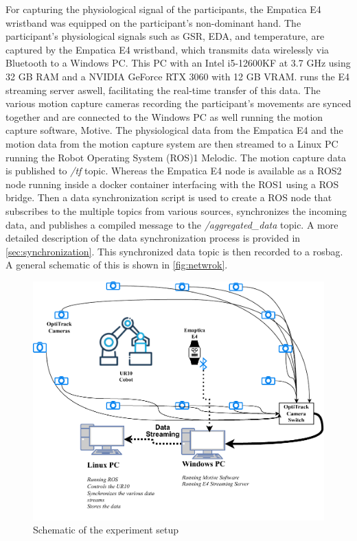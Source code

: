 For capturing the physiological signal of the participants, the Empatica E4 wristband was equipped on the participant's non-dominant hand. The participant's physiological signals such as \gls{GSR}, \gls{EDA},  and temperature, are captured by the Empatica E4 wristband, which transmits data wirelessly via Bluetooth to a Windows PC. This PC with an Intel i5-12600KF at 3.7 GHz using
32 GB RAM and a NVIDIA GeForce RTX 3060 with 12 GB
VRAM.
runs the E4 streaming server aswell, facilitating the real-time transfer of this data. The various motion capture cameras recording the participant's movements are synced  together and are connected to the Windows PC as well running the motion capture software, Motive.
The physiological data from the Empatica E4 and the motion data from the motion capture system are then streamed to a Linux PC running the Robot Operating System (ROS)1 Melodic.
The motion capture data is published to \textit{/tf} topic. Whereas the Empatica E4 node is available as a ROS2 node running inside a docker container interfacing with the ROS1 using a ROS bridge.
Then a data synchronization script is used to create a ROS node that subscribes to the multiple topics from various sources, synchronizes the incoming data, and publishes a compiled message to the \textit{/aggregated\_data} topic. A more detailed description of the data synchronization process is provided in  \autoref{sec:synchronization}.
This synchronized data topic is then recorded to a rosbag. A general schematic of this is shown in \autoref{fig:netwrok}.


\begin{figure}[h]
	\centering
	\includegraphics[width=0.9\columnwidth]{images/Experiment system.drawio.pdf}
	\caption{Schematic of the experiment setup}
	\label{fig:netwrok}
\end{figure}


